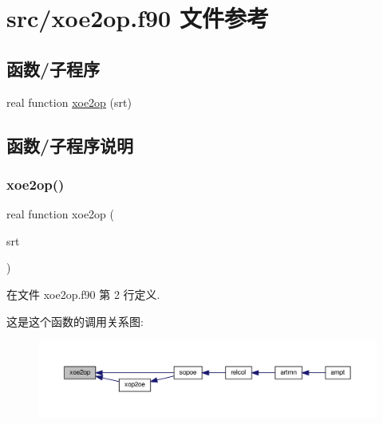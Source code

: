 \hypertarget{xoe2op_8f90}{}\section{src/xoe2op.f90 文件参考}
\label{xoe2op_8f90}
\subsection*{函数/子程序}
\begin{DoxyCompactItemize}
\item 
real function \mbox{\hyperlink{xoe2op_8f90_a8ce877f4f16ece85b6624d30fa06c0fd}{xoe2op}} (srt)
\end{DoxyCompactItemize}


\subsection{函数/子程序说明}
\mbox{\label{xoe2op_8f90_a8ce877f4f16ece85b6624d30fa06c0fd}} 
\subsubsection{\texorpdfstring{xoe2op()}{xoe2op()}}
{\footnotesize\ttfamily real function xoe2op (\begin{DoxyParamCaption}\item[{}]{srt }\end{DoxyParamCaption})}



在文件 xoe2op.\+f90 第 2 行定义.

这是这个函数的调用关系图\+:
\nopagebreak
\begin{figure}[H]
\begin{center}
\leavevmode
\includegraphics[width=350pt]{xoe2op_8f90_a8ce877f4f16ece85b6624d30fa06c0fd_icgraph}
\end{center}
\end{figure}
